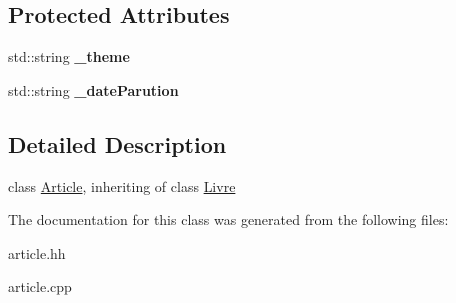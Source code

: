\subsection*{Protected Attributes}
\begin{DoxyCompactItemize}
\item 
\hypertarget{classArticle_abfa5c99c0ced717090470e7767c9966f}{
std::string {\bfseries \_\-theme}}
\label{classArticle_abfa5c99c0ced717090470e7767c9966f}

\item 
\hypertarget{classArticle_a9769e51b548f0a8216113ab00db9f71c}{
std::string {\bfseries \_\-dateParution}}
\label{classArticle_a9769e51b548f0a8216113ab00db9f71c}

\end{DoxyCompactItemize}


\subsection{Detailed Description}
class \hyperlink{classArticle}{Article}, inheriting of class \hyperlink{classLivre}{Livre} 

The documentation for this class was generated from the following files:\begin{DoxyCompactItemize}
\item 
article.hh\item 
article.cpp\end{DoxyCompactItemize}

